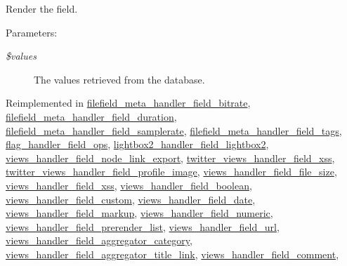 Render the field.

\begin{Desc}
\item[Parameters:]
\begin{description}
\item[{\em \$values}]The values retrieved from the database. \end{description}
\end{Desc}


Reimplemented in \hyperlink{classfilefield__meta__handler__field__bitrate_8b49b6ccdf60cd91f344b3d781cdd51c}{filefield\_\-meta\_\-handler\_\-field\_\-bitrate}, \hyperlink{classfilefield__meta__handler__field__duration_f511f413dd52df372f7dc396efcc08f2}{filefield\_\-meta\_\-handler\_\-field\_\-duration}, \hyperlink{classfilefield__meta__handler__field__samplerate_8dd9fcfcf352e9699f02deed43a60e2c}{filefield\_\-meta\_\-handler\_\-field\_\-samplerate}, \hyperlink{classfilefield__meta__handler__field__tags_65aaea80f0139f1a83bd876273fdec51}{filefield\_\-meta\_\-handler\_\-field\_\-tags}, \hyperlink{classflag__handler__field__ops_3732dd37e3011699c7489e02e2aa3655}{flag\_\-handler\_\-field\_\-ops}, \hyperlink{classlightbox2__handler__field__lightbox2_141baaefa052c49b0084cd88dc3d50ce}{lightbox2\_\-handler\_\-field\_\-lightbox2}, \hyperlink{classviews__handler__field__node__link__export_84502b9c08a9b0fa22eb914b278d1a4f}{views\_\-handler\_\-field\_\-node\_\-link\_\-export}, \hyperlink{classtwitter__views__handler__field__xss_bdab73a5e799f01200e58edcd603a32d}{twitter\_\-views\_\-handler\_\-field\_\-xss}, \hyperlink{classtwitter__views__handler__field__profile__image_f584af456dbbe206bdeea00682cebf3d}{twitter\_\-views\_\-handler\_\-field\_\-profile\_\-image}, \hyperlink{classviews__handler__field__file__size_9ceb28e958ee939634f1c91e28b8579c}{views\_\-handler\_\-field\_\-file\_\-size}, \hyperlink{classviews__handler__field__xss_fbfbc9ee1d2927e22cd5385c5f2fa918}{views\_\-handler\_\-field\_\-xss}, \hyperlink{classviews__handler__field__boolean_d7d7fc1b29362cee6b2f043e029052af}{views\_\-handler\_\-field\_\-boolean}, \hyperlink{classviews__handler__field__custom_0498d3ad0dff40c9e49ec599363c2157}{views\_\-handler\_\-field\_\-custom}, \hyperlink{classviews__handler__field__date_4ed821df9270dc90bd3c2103d7136d47}{views\_\-handler\_\-field\_\-date}, \hyperlink{classviews__handler__field__markup_7a6eb0c91f30643eb29d19dcc76b23d3}{views\_\-handler\_\-field\_\-markup}, \hyperlink{classviews__handler__field__numeric_9c76aeef951c45385fd91a22e5e656aa}{views\_\-handler\_\-field\_\-numeric}, \hyperlink{classviews__handler__field__prerender__list_e29a9fc47e5a83e9a8eb314dc46e68cf}{views\_\-handler\_\-field\_\-prerender\_\-list}, \hyperlink{classviews__handler__field__url_6f96c8adfdd1892619793359448e70ad}{views\_\-handler\_\-field\_\-url}, \hyperlink{classviews__handler__field__aggregator__category_7e4b0ebcef6f6f5b37480eb15eb378f0}{views\_\-handler\_\-field\_\-aggregator\_\-category}, \hyperlink{classviews__handler__field__aggregator__title__link_1b3d319f7a95e1885726a975f1755b9f}{views\_\-handler\_\-field\_\-aggregator\_\-title\_\-link}, \hyperlink{classviews__handler__field__comment_c5e0fecfcd448920e3d837c1daed59fa}{views\_\-handler\_\-field\_\-comment}, 